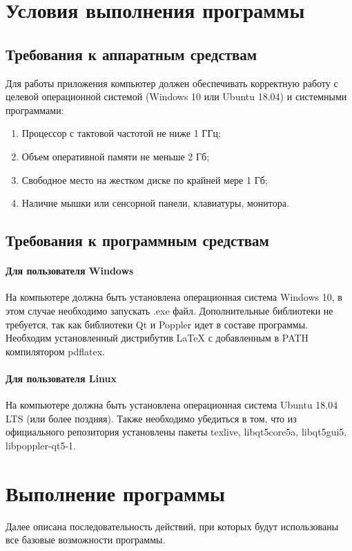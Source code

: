 \documentclass[opermanual]{espd}
\begin{document}
\section{Условия выполнения программы}
\subsection{Требования к аппаратным средствам}
Для работы приложения компьютер должен обеспечивать корректную работу с целевой операционной системой (Windows 10 или Ubuntu 18.04) и системными программами:
\begin{enumerate}
\item Процессор с тактовой частотой не ниже 1 ГГц;
\item Объем оперативной памяти не меньше 2 Гб;
\item Свободное место на жестком диске по крайней мере 1 Гб;
\item Наличие мышки или сенсорной панели, клавиатуры, монитора.
\end{enumerate}

\subsection{Требования к программным средствам}
\paragraph{Для пользователя Windows}
На компьютере должна быть установлена операционная система Windows 10, в этом случае необходимо запускать .exe файл. Дополнительные библиотеки не требуется, так как библиотеки Qt и Poppler идет в составе программы. Необходим установленный дистрибутив LaTeX с добавленным в PATH компилятором pdflatex.

\paragraph{Для пользователя Linux}
На компьютере должна быть установлена операционная система Ubuntu 18.04 LTS (или более поздняя). Также необходимо убедиться в том, что из официального репозитория установлены пакеты texlive, libqt5core5a, libqt5gui5, libpoppler-qt5-1.

\section{Выполнение программы}
Далее описана последовательность действий, при которых будут использованы все базовые возможности программы.
\end{document}
